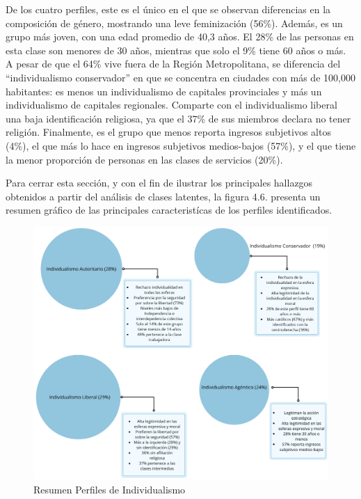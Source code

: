 \documentclass[12pt,twoside]{templates/facsothesis}
\begin{document}
De los cuatro perfiles, este es el único en el que se observan diferencias en la composición de género, mostrando una leve feminización (56\%). Además, es un grupo más joven, con una edad promedio de 40,3 años. El 28\% de las personas en esta clase son menores de 30 años, mientras que solo el 9\% tiene 60 años o más. A pesar de que el 64\% vive fuera de la Región Metropolitana, se diferencia del ``individualismo conservador'' en que se concentra en ciudades con más de 100,000 habitantes: es menos un individualismo de capitales provinciales y más un individualismo de capitales regionales. Comparte con el individualismo liberal una baja identificación religiosa, ya que el 37\% de sus miembros declara no tener religión. Finalmente, es el grupo que menos reporta ingresos subjetivos altos (4\%), el que más lo hace en ingresos subjetivos medios-bajos (57\%), y el que tiene la menor proporción de personas en las clases de servicios (20\%).

Para cerrar esta sección, y con el fin de ilustrar los principales hallazgos obtenidos a partir del análisis de clases latentes, la figura 4.6. presenta un resumen gráfico de las principales caracteristícas de los perfiles identificados.

\begin{figure}[!ht]

{\centering \includegraphics[width=1\linewidth,]{images/fig_esferas} 

}

\caption{Resumen Perfiles de Individualismo}\label{fig:nombre}
\end{figure}
\end{document}
